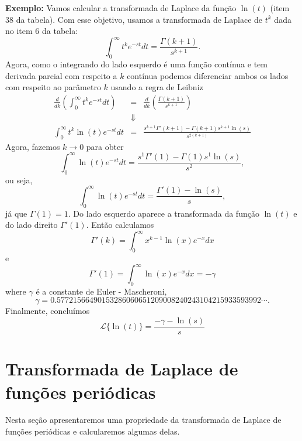 \documentclass[a4paper,10pt]{book}
\begin{document}
 {\bf Exemplo: }Vamos calcular a transformada de Laplace da função $\ln(t)$ (item 38 da tabela). Com esse objetivo, usamos a transformada de Laplace de $t^k$ dada no item 6 da tabela:
\begin{equation}
\int_0^\infty t^ke^{-st}dt=\frac{\Gamma(k+1)}{s^{k+1}}.
\end{equation}
Agora, como o integrando do lado esquerdo é uma função contínua e tem derivada parcial com respeito a $k$ contínua podemos diferenciar ambos os lados com respeito ao parâmetro $k$ usando a regra de Leibniz
\begin{eqnarray*}
\frac{d}{dk}\left(\int_0^\infty t^ke^{-st}dt\right)&=&\frac{d}{dk}\left(\frac{\Gamma(k+1)}{s^{k+1}}\right)\\
&\Downarrow&\\
\int_0^\infty t^k \ln(t) e^{-st}dt&=&\frac{s^{k+1}\Gamma'(k+1)-\Gamma(k+1)s^{k+1}\ln(s)}{s^{2(k+1)}}
\end{eqnarray*}
Agora, fazemos $k\to 0$ para obter
\begin{equation}
\int_0^\infty \ln(t) e^{-st}dt=\frac{s^{1}\Gamma'(1)-\Gamma(1)s^{1}\ln(s)}{s^{2}},
\end{equation}
ou seja,
\begin{equation}
\int_0^\infty \ln(t) e^{-st}dt=\frac{\Gamma'(1)-\ln(s)}{s},
\end{equation}
já que $\Gamma(1)=1$. Do lado esquerdo aparece a transformada da função $\ln(t)$ e do lado direito $\Gamma'(1)$. Então calculamos
\begin{equation}
\Gamma'(k)=\int_0^\infty x^{k-1}\ln(x) e^{-x}dx
\end{equation}
e
\begin{equation}
\Gamma'(1)=\int_0^\infty \ln(x) e^{-x} dx=-\gamma
\end{equation}
where $\gamma$ é a constante de Euler - Mascheroni,
\begin{equation}
\gamma=0.57721566490153286060651209008240243104215933593992\cdots.
\end{equation}
Finalmente, concluímos
\begin{equation}
\mathcal{L}\{\ln(t)\}=\frac{-\gamma-\ln(s)}{s}
\end{equation}



\section{Transformada de Laplace de funções periódicas}
Nesta seção apresentaremos uma propriedade da transformada de Laplace de funções periódicas e calcularemos algumas delas.
\end{document}
